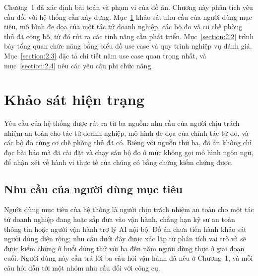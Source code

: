 \documentclass[../DoAn.tex]{subfiles}
\begin{document}

Chương~1 đã xác định bài toán và phạm vi của đồ án. Chương này phân tích yêu cầu đối với hệ thống cần xây dựng. Mục~\ref{section:2.1} khảo sát nhu cầu của người dùng mục tiêu, mô hình đe dọa của một tác tử doanh nghiệp, các bộ đo và cơ chế phòng thủ đã công bố, từ đó rút ra các tính năng cần phát triển. Mục~\ref{section:2.2} trình bày tổng quan chức năng bằng biểu đồ use case và quy trình nghiệp vụ đánh giá. Mục~\ref{section:2.3} đặc tả chi tiết năm use case quan trọng nhất, và mục~\ref{section:2.4} nêu các yêu cầu phi chức năng.

\section{Khảo sát hiện trạng}
\label{section:2.1}

Yêu cầu của hệ thống được rút ra từ ba nguồn: nhu cầu của người chịu trách nhiệm an toàn cho tác tử doanh nghiệp, mô hình đe dọa của chính tác tử đó, và các bộ đo cùng cơ chế phòng thủ đã có. Riêng với nguồn thứ ba, đồ án không chỉ đọc bài báo mà đã cài đặt và chạy sáu bộ đo ở mức không gọi mô hình ngôn ngữ, để nhận xét về hành vi thực tế của chúng có bằng chứng kiểm chứng được.

\subsection{Nhu cầu của người dùng mục tiêu}
\label{subsection:2.1.1}

Người dùng mục tiêu của hệ thống là người chịu trách nhiệm an toàn cho một tác tử doanh nghiệp đang hoặc sắp đưa vào vận hành, chẳng hạn kỹ sư an toàn thông tin hoặc người vận hành trợ lý AI nội bộ. Đồ án chưa tiến hành khảo sát người dùng diện rộng; nhu cầu dưới đây được xác lập từ phân tích vai trò và sẽ được kiểm chứng ở buổi dùng thử với ba đến năm người dùng thực ở giai đoạn cuối. Người dùng này cần trả lời ba câu hỏi vận hành đã nêu ở Chương~1, và mỗi câu hỏi dẫn tới một nhóm nhu cầu đối với công cụ.
\end{document}

